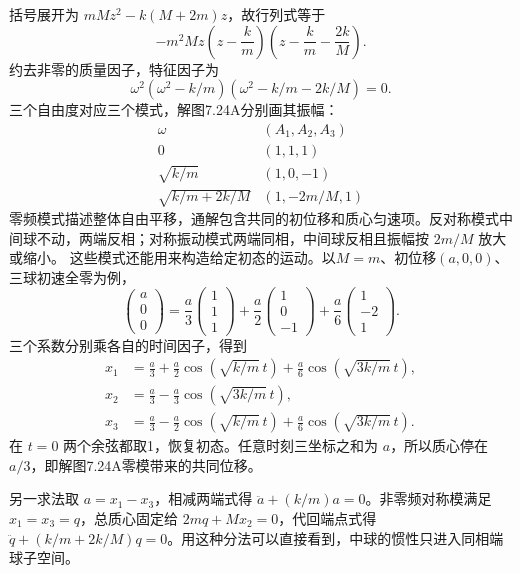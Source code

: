 \documentclass[UTF8,fontset=fandol,a4paper,11pt]{ctexart}
\begin{document}
括号展开为 $mMz^2-k(M+2m)z$，故行列式等于
\[
 -m^2M z\left(z-\frac km\right)
 \left(z-\frac km-\frac{2k}{M}\right).
\]
约去非零的质量因子，特征因子为
\[\omega^2(\omega^2-k/m)(\omega^2-k/m-2k/M)=0.\]
三个自由度对应三个模式，解图7.24A分别画其振幅：
\[\boxed{\begin{array}{c|c}
\omega& (A_1,A_2,A_3)\\\hline
0&(1,1,1)\\
\sqrt{k/m}&(1,0,-1)\\
\sqrt{k/m+2k/M}&(1,-2m/M,1)
\end{array}}\]
零频模式描述整体自由平移，通解包含共同的初位移和质心匀速项。反对称模式中间球不动，两端反相；对称振动模式两端同相，中间球反相且振幅按 $2m/M$ 放大或缩小。
这些模式还能用来构造给定初态的运动。以$M=m$、初位移$(a,0,0)$、三球初速全零为例，
\[\begin{pmatrix}a\\0\\0\end{pmatrix}
=\frac a3\begin{pmatrix}1\\1\\1\end{pmatrix}
+\frac a2\begin{pmatrix}1\\0\\-1\end{pmatrix}
+\frac a6\begin{pmatrix}1\\-2\\1\end{pmatrix}.\]
三个系数分别乘各自的时间因子，得到
\[\begin{aligned}
x_1&=\frac a3+\frac a2\cos(\sqrt{k/m}\,t)+\frac a6\cos(\sqrt{3k/m}\,t),\\
x_2&=\frac a3-\frac a3\cos(\sqrt{3k/m}\,t),\\
x_3&=\frac a3-\frac a2\cos(\sqrt{k/m}\,t)+\frac a6\cos(\sqrt{3k/m}\,t).
\end{aligned}\]
在 $t=0$ 两个余弦都取1，恢复初态。任意时刻三坐标之和为 $a$，所以质心停在 $a/3$，即解图7.24A零模带来的共同位移。

另一求法取 $a=x_1-x_3$，相减两端式得 $\ddot a+(k/m)a=0$。非零频对称模满足 $x_1=x_3=q$，总质心固定给 $2mq+Mx_2=0$，代回端点式得 $\ddot q+(k/m+2k/M)q=0$。用这种分法可以直接看到，中球的惯性只进入同相端球子空间。
\end{document}
